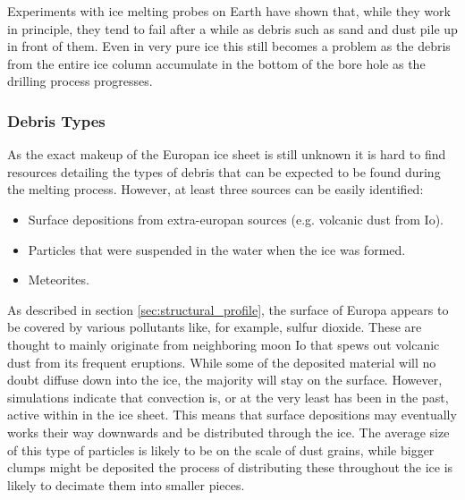 Experiments with ice melting probes on Earth have shown that, while they work in principle, they tend to fail after a while as debris such as sand and dust pile up in front of them\cite{article:di1998a}. Even in very pure ice this still becomes a problem as the debris from the entire ice column accumulate in the bottom of the bore hole as the drilling process progresses. 

\subsubsection{Debris Types}
As the exact makeup of the Europan ice sheet is still unknown it is hard to find resources detailing the types of debris that can be expected to be found during the melting process. However, at least three sources can be easily identified:\\

\begin{itemize}
	\item Surface depositions from extra-europan sources (e.g. volcanic dust from Io).
	\item Particles that were suspended in the water when the ice was formed.
	\item Meteorites.
\end{itemize}

\noindent
As described in section \ref{sec:structural_profile}, the surface of Europa appears to be covered by various pollutants like, for example, sulfur dioxide. These are thought to mainly originate from neighboring moon Io that spews out volcanic dust from its frequent eruptions. While some of the deposited material will no doubt diffuse down into the ice, the majority will stay on the surface. However, simulations indicate that convection is, or at the very least has been in the past, active within in the ice sheet\cite{article:barr2014a}. This means that surface depositions may eventually works their way downwards and be distributed through the ice. The average size of this type of particles is likely to be on the scale of dust grains, while bigger clumps might be deposited the process of distributing these throughout the ice is likely to decimate them into smaller pieces. \\

